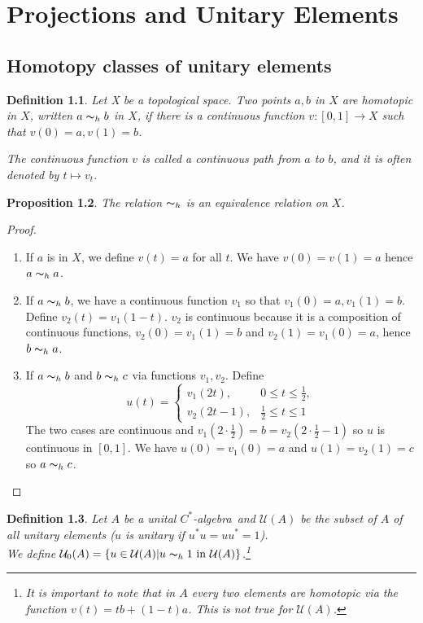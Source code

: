 \documentclass{book}
\newtheorem{definition}{Definition}[section]
\newtheorem{proposition}[definition]{Proposition}
\def\cstar{\(C^*\)-algebra}
\begin{document}
\chapter{Projections and Unitary Elements}
\section{Homotopy classes of unitary elements}
\begin{definition}
  Let X be a topological space. Two points \(a,b\) in \(X\) are 
  \textnormal{homotopic} in \(X\), written \(a \thicksim_h b\) in \(X\), if 
  there is a continuous function \(v:[0,1]\rightarrow X\) such that \(v(0)=a,v(1)=b\).\par
  The continuous function \(v\) is called a \textnormal{continuous path} from
  \(a\) to \(b\), and it is often denoted by \(t \mapsto v_t\).
\end{definition}
\begin{proposition}
  The relation \(\thicksim_h\) is an equivalence relation on \(X\).
\end{proposition}
\begin{proof}
  \begin{enumerate}
    \item If \(a\) is in \(X\), we define \(v(t)=a\) for all \(t\).
      We have \(v(0)=v(1)=a\) hence \(a\thicksim_h a\).
    \item If \(a\thicksim_h b\), we have a continuous function \(v_1\) 
    so that \(v_1(0)=a, v_1(1)=b\).\\ 
    Define \(v_2(t) = v_1(1-t)\).
    \(v_2\) is continuous because it is a composition of continuous functions, 
    \(v_2(0) =v_1(1)=b\) and \(v_2(1)=v_1(0)=a\), hence \(b\thicksim_h a\).
    \item If \(a\thicksim_h b\) and \(b\thicksim_h c\) via functions \(v_1, v_2\). Define
    \[u(t)=\begin{cases}v_1(2t), & 0\le t\le \frac12,\\v_2(2t-1), & \frac12\le t\le1\end{cases}\]
    The two cases are continuous and \(v_1(2\cdot\frac{1}{2})=b=v_2(2\cdot \frac{1}{2}-1)\) so \(u\) is continuous in \([0,1]\). 
    We have \(u(0)=v_1(0)=a\) and \(u(1)=v_2(1)=c\) so \(a\thicksim_h c\).
  \end{enumerate}
\end{proof}
\begin{definition}
  Let \(A\) be a unital \cstar\ and \(\mathcal{U}(A)\) be the subset of \(A\) of all unitary elements (\(u\) is unitary if \(u^*u=uu^*=1\)).\\
  We define \(\mathcal{U}_0(A)=\{u\in \mathcal{U}(A)|u\thicksim_h 1\mbox{ in }\mathcal{U}(A)\}\).\footnote{It is 
  important to note that in \(A\) every two elements are homotopic via the function \(v(t) = tb+(1-t)a\). 
  This is not true for \(\mathcal{U}(A)\).} 
\end{definition}
\end{document}
